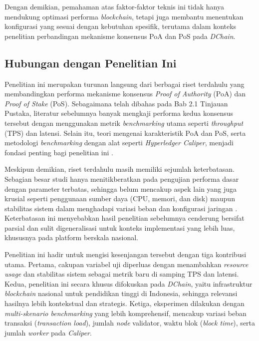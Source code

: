 Dengan demikian, pemahaman atas faktor-faktor teknis ini tidak hanya mendukung optimasi performa \textit{blockchain}, tetapi juga membantu menentukan konfigurasi yang sesuai dengan kebutuhan spesifik, terutama dalam konteks penelitian perbandingan mekanisme konsensus PoA dan PoS pada \textit{DChain}.


\subsection{Hubungan dengan Penelitian Ini}

Penelitian ini merupakan turunan langsung dari berbagai riset terdahulu yang membandingkan performa mekanisme konsensus \textit{Proof of Authority} (PoA) dan \textit{Proof of Stake} (PoS). Sebagaimana telah dibahas pada Bab 2.1 Tinjauan Pustaka, literatur sebelumnya banyak mengkaji performa kedua konsensus tersebut dengan menggunakan metrik \textit{benchmarking} utama seperti \textit{throughput} (TPS) dan latensi. Selain itu, teori mengenai karakteristik PoA dan PoS, serta metodologi \textit{benchmarking} dengan alat seperti \textit{Hyperledger Caliper}, menjadi fondasi penting bagi penelitian ini \cite{dinh2017, fan2020, thakkar2018, nguyen2019, li2023}.

Meskipun demikian, riset terdahulu masih memiliki sejumlah keterbatasan. Sebagian besar studi hanya menitikberatkan pada pengujian performa dasar dengan parameter terbatas, sehingga belum mencakup aspek lain yang juga krusial seperti penggunaan sumber daya (CPU, memori, dan disk) maupun stabilitas sistem dalam menghadapi variasi beban dan konfigurasi jaringan \cite{kaur2021, ucbas2023, gramoli2023}. Keterbatasan ini menyebabkan hasil penelitian sebelumnya cenderung bersifat parsial dan sulit digeneralisasi untuk konteks implementasi yang lebih luas, khususnya pada platform berskala nasional.

Penelitian ini hadir untuk mengisi kesenjangan tersebut dengan tiga kontribusi utama. Pertama, cakupan variabel uji diperluas dengan menambahkan \textit{resource usage} dan stabilitas sistem sebagai metrik baru di samping TPS dan latensi. Kedua, penelitian ini secara khusus difokuskan pada \textit{DChain}, yaitu infrastruktur \textit{blockchain} nasional untuk pendidikan tinggi di Indonesia, sehingga relevansi hasilnya lebih kontekstual dan strategis. Ketiga, eksperimen dilakukan dengan \textit{multi-skenario benchmarking} yang lebih komprehensif, mencakup variasi beban transaksi (\textit{transaction load}), jumlah \textit{node} validator, waktu blok (\textit{block time}), serta jumlah \textit{worker} pada \textit{Caliper}.

